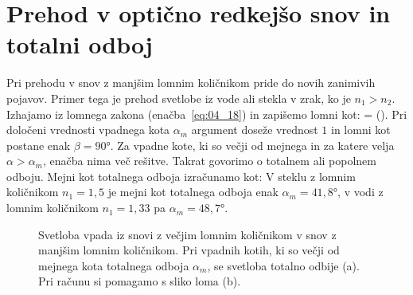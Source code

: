 \section{Prehod v optično redkejšo snov in totalni odboj}
Pri prehodu v snov z manjšim lomnim količnikom pride do novih zanimivih pojavov.
Primer tega je prehod svetlobe iz vode ali stekla v zrak, ko je $n_1>n_2$.
Izhajamo iz lomnega zakona (enačba~\ref{eq:04_18}) in zapišemo lomni kot:
\beq
\beta = \arcsin \left(\sin \alpha\right)\!\!.
\label{eq:04_52}
\eeq
Pri določeni vrednosti vpadnega kota $\alpha_m$ 
argument doseže vrednost $1$ in lomni kot
postane enak $\beta = 90\si{\degree}$. Za vpadne kote, ki so večji od 
mejnega in za katere velja
$\alpha> \alpha_m$, enačba nima več rešitve. Takrat govorimo o totalnem 
ali popolnem odboju. Mejni kot totalnega odboja izračunamo kot:
V steklu z lomnim količnikom $n_1=1,5$ je mejni kot totalnega odboja
enak $\alpha_m = 41,8\si{\degree}$, v vodi z lomnim količnikom 
$n_1 = 1,33$ pa $\alpha_m = 48,7\si{\degree}$.
\begin{figure}[ht]
\centering
\def\svgwidth{140truemm} 

\caption{Svetloba vpada iz snovi z večjim lomnim količnikom v snov z manjšim lomnim količnikom.
Pri vpadnih kotih, ki so večji od mejnega kota totalnega odboja $\alpha_m$, se svetloba totalno odbije (a). Pri računu
si pomagamo s sliko loma (b).}
\label{fig:04_totalni}
\end{figure}

